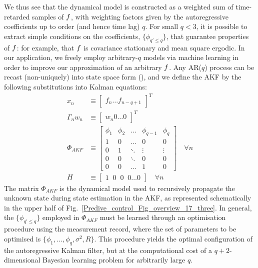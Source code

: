 \noindent We thus see that the dynamical model is constructed as a weighted sum of time-retarded samples of $f$, with weighting factors given by the autoregressive coefficients up to order (and hence time lag) $q$. For small $q < 3$, it is possible to extract simple conditions on the coefficients, $\{ \phi_{q' \leq q} \}$, that guarantee properties of $f$: for example, that $f$ is covariance stationary and mean square ergodic. In our application, we freely employ arbitrary-$q$ models via machine learning in order to improve our approximation of an arbitrary $f$. Any AR($q$) process can be recast (non-uniquely) into state space form (\cite{harvey1990forecasting}), and we define the AKF by the following substitutions into Kalman equations:
\begin{align}
	x_n & \equiv  \begin{bmatrix} f_{n} \hdots f_{n-q+1} \end{bmatrix}^T \\
	\Gamma_n w_n & \equiv \begin{bmatrix} w_{n} 0 \hdots 0 \end{bmatrix}^T \\
	\Phi_{AKF} & \equiv 
	\begin{bmatrix}
		\phi_1 & \phi_2 & \hdots & \phi_{q-1} & \phi_q \\ 
		1 & 0 & \hdots & 0 & 0 \\  
		0 & 1 & \ddots & \vdots & \vdots \\ 
		0 & 0 & \ddots & 0 & 0 \\ 
		0 & 0 & \hdots & 1 & 0 
	\end{bmatrix} \quad \forall n \label{eqn:akf_Phi} \\
	H & \equiv \begin{bmatrix} 1\;\;0\;\;0\;\;0\hdots0 \end{bmatrix} \quad \forall n  
\end{align}
The matrix $\Phi_{AKF}$ is the dynamical model used to recursively propagate the unknown state during state estimation in the AKF, as represented schematically in the upper half of Fig.~\ref{Predive_control_Fig_overview_17_three}. In general, the $\{\phi_{q' \leq q}\}$ employed in $\Phi_{AKF}$ must be learned through an optimisation procedure using the measurement record, where the set of parameters to be optimised is $\{\phi_1, \hdots, \phi_q, \sigma^2, R \}$. This procedure yields the optimal configuration of the autoregressive Kalman filter, but at the computational cost of a $q+2$-dimensional Bayesian learning problem for arbitrarily large $q$.

